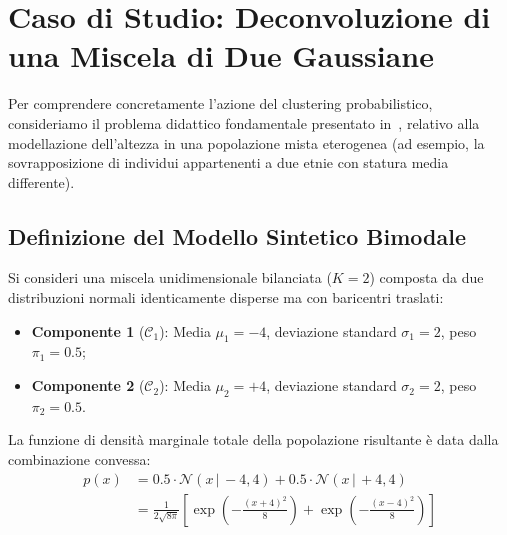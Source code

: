 \section{Caso di Studio: Deconvoluzione di una Miscela di Due Gaussiane}
\label{sec:dm-case-study-two-gaussians}

Per comprendere concretamente l'azione del clustering probabilistico, consideriamo il problema didattico fondamentale presentato in~\cite{tan2018}, relativo alla modellazione dell'altezza in una popolazione mista eterogenea (ad esempio, la sovrapposizione di individui appartenenti a due etnie con statura media differente).

\subsection{Definizione del Modello Sintetico Bimodale}

Si consideri una miscela unidimensionale bilanciata ($K=2$) composta da due distribuzioni normali identicamente disperse ma con baricentri traslati:
\begin{itemize}
    \item \textbf{Componente 1} ($\mathcal{C}_1$): Media $\mu_1 = -4$, deviazione standard $\sigma_1 = 2$, peso $\pi_1 = 0.5$;
    \item \textbf{Componente 2} ($\mathcal{C}_2$): Media $\mu_2 = +4$, deviazione standard $\sigma_2 = 2$, peso $\pi_2 = 0.5$.
\end{itemize}
La funzione di densità marginale totale della popolazione risultante è data dalla combinazione convessa:
\begin{align}
\label{eq:dm-two-gaussian-pdf}
p(x) &= 0.5 \cdot \mathcal{N}(x \,|\, -4, 4) + 0.5 \cdot \mathcal{N}(x \,|\, +4, 4) \nonumber \\
&= \frac{1}{2\sqrt{8\pi}} \left[ \exp\left( -\frac{(x+4)^2}{8} \right) + \exp\left( -\frac{(x-4)^2}{8} \right) \right]
\end{align}

